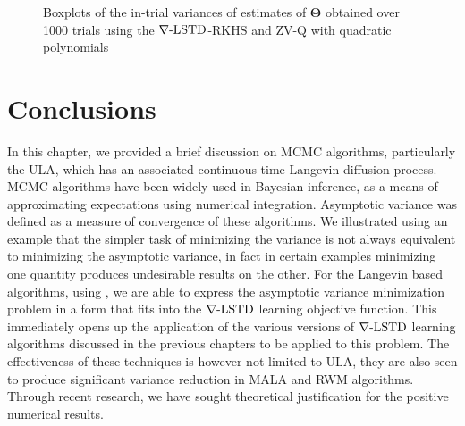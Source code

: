 \begin{figure}[htbp]
{		 
	} 
\caption{Boxplots of the in-trial variances of estimates of $\boldsymbol{\Theta}$ obtained over 1000 trials using the $\nabla\text{-LSTD}$-RKHS and ZV-Q with quadratic polynomials}
\label{fig:mcmc_box_var_Theta}
\end{figure}

\section{Conclusions}
In this chapter, we provided a brief discussion on MCMC algorithms, particularly the ULA, which has an associated continuous time Langevin diffusion process. MCMC algorithms have been widely used in Bayesian inference, as a means of approximating expectations using numerical integration. Asymptotic variance was defined as a measure of convergence of these algorithms. We illustrated using an example that the simpler task of minimizing the variance is not always equivalent to minimizing the asymptotic variance, in fact in certain examples minimizing one quantity produces undesirable results on the other. For the Langevin based algorithms, using , we are able to express the asymptotic variance minimization problem in a form that fits into the $\nabla\text{-LSTD}$ learning objective function. This immediately opens up the application of the various versions of $\nabla\text{-LSTD}$ learning algorithms discussed in the previous chapters to be applied to this problem. The effectiveness of these techniques is however not limited to ULA, they are also seen to produce significant variance reduction in MALA and RWM algorithms. Through recent research, we have sought theoretical justification for the positive numerical results.  
